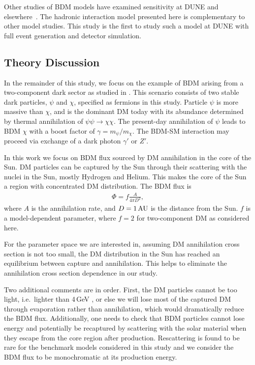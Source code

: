 Other studies of BDM models have examined sensitivity at DUNE and elsewhere~\cite{Agashe:2014yua,Berger:2014sqa,Alhazmi:2016qcs,Necib:2016aez,Kim:2016zjx,Kachulis:2017nci,Giudice:2017zke,Chatterjee:2018mej,Kim:2018veo}. The hadronic interaction model presented here is complementary to other model studies. This study is the first to study such a model at DUNE with full event generation and detector simulation.

\subsection{\label{sec:level2}Theory Discussion}
In the remainder of this study, we focus on the example of BDM arising from a two-component dark sector as studied in \cite{Agashe:2014yua, Berger:2014sqa}. This scenario consists of two stable dark particles, $\psi$ and $\chi$, specified as fermions in this study. Particle $\psi$ is more massive than $\chi$, and is the dominant DM today with its abundance determined by thermal annihilation of $\psi\psi\rightarrow\chi\chi$. The present-day annihilation of $\psi$ leads to BDM $\chi$ with a boost factor of $\gamma = m_\psi/m_\chi$. The BDM-SM interaction may proceed via exchange of a dark photon $\gamma'$ or $Z'$.

In this work we focus on BDM flux sourced by DM annihilation in the core of the Sun. DM particles can be captured by the Sun through their scattering with the nuclei in the Sun, mostly Hydrogen and Helium. This makes the core of the Sun a region with concentrated DM distribution. The BDM flux is
\begin{eqnarray} \label{eq:flux}
\Phi= f \frac{A}{4\pi D^2},
\end{eqnarray}
where $A$ is the annihilation rate, and $D = 1\,\rm{AU}$ is the distance from the Sun. $f$ is a model-dependent parameter, where $f = 2$ for two-component DM as considered here.

For the parameter space we are interested in, assuming DM annihilation cross section is not too small, the DM distribution in the Sun has reached an equilibrium between capture and annihilation. This helps to eliminate the annihilation cross section dependence in our study.

Two additional comments are in order. First, the DM particles cannot be too light, i.e.\ lighter than 4\,GeV \cite{Griest:1986yu,Gould:1987ju}, or else we will lose most of the captured DM through evaporation rather than annihilation, which would dramatically reduce the BDM flux. Additionally, one needs to check that BDM particles cannot lose energy and potentially be recaptured by scattering with the solar material when they escape from the core region after production. Rescattering is found to be rare for the benchmark models considered in this study and we consider the BDM flux to be monochromatic at its production energy.

